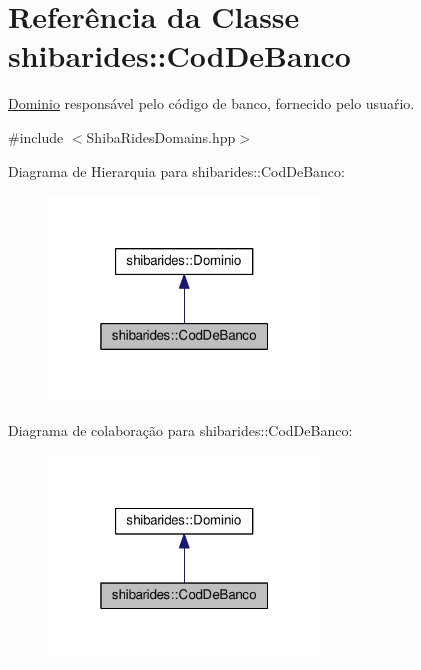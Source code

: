 \hypertarget{classshibarides_1_1CodDeBanco}{}\section{Referência da Classe shibarides\+:\+:Cod\+De\+Banco}
\label{classshibarides_1_1CodDeBanco}


\hyperlink{classshibarides_1_1Dominio}{Dominio} responsável pelo código de banco, fornecido pelo usuaŕio.  




{\ttfamily \#include $<$Shiba\+Rides\+Domains.\+hpp$>$}



Diagrama de Hierarquia para shibarides\+:\+:Cod\+De\+Banco\+:\nopagebreak
\begin{figure}[H]
\begin{center}
\leavevmode
\includegraphics[width=205pt]{classshibarides_1_1CodDeBanco__inherit__graph}
\end{center}
\end{figure}


Diagrama de colaboração para shibarides\+:\+:Cod\+De\+Banco\+:\nopagebreak
\begin{figure}[H]
\begin{center}
\leavevmode
\includegraphics[width=205pt]{classshibarides_1_1CodDeBanco__coll__graph}
\end{center}
\end{figure}
